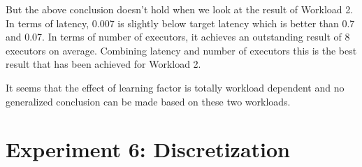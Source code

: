 But the above conclusion doesn't hold when we look at the result of Workload 2. In terms of latency, 0.007 is slightly below target latency which is better than 0.7 and 0.07. In terms of number of executors, it achieves an outstanding result of 8 executors on average. Combining latency and number of executors this is the best result that has been achieved for Workload 2.

It seems that the effect of learning factor is totally workload dependent and no generalized conclusion can be made based on these two workloads.
\clearpage
\section{Experiment 6: Discretization}